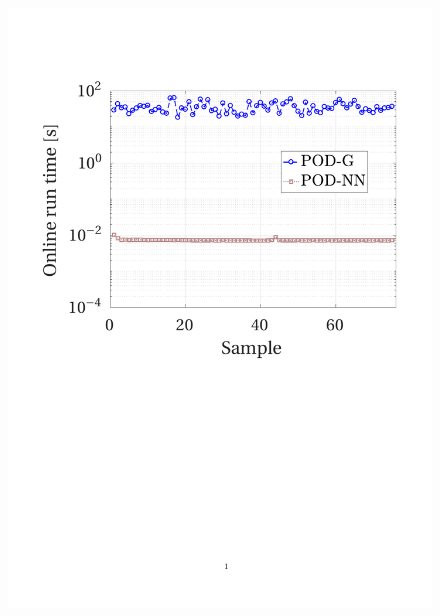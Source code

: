 \documentclass[12pt, a4paper, twoside, openright]{report}
\numberwithin{equation}{chapter}
\theoremstyle{theorem}
\theoremstyle{definition}
\theoremstyle{remark}
\theoremstyle{proposition}
\numberwithin{figure}{chapter}
\begin{document}
		\begin{figure}[H]
			\center
			\includegraphics[scale = 0.43, trim = {1.5cm 9cm 1.5cm 3.5cm}, clip]{dc_200_time}

\end{figure}
\end{document}
